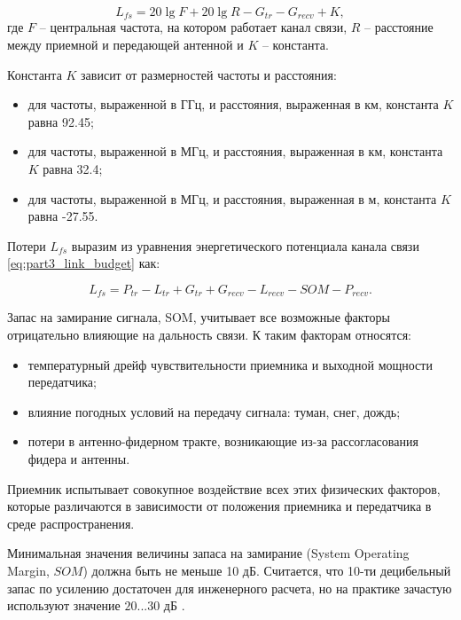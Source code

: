 \begin{equation}
  \label{eq:part3_L_fs}
  L_{fs} = 20 \lg{F} + 20\lg{R} - G_{tr} - G_{recv} + K,
  \end{equation}
где $F$ -- центральная частота, на котором работает канал связи, $R$ -- расстояние между приемной и передающей антенной и $K$ -- константа.

Константа $K$ зависит от размерностей частоты и расстояния:

\begin{itemize}
  \item для частоты, выраженной в ГГц, и расстояния, выраженная в км, константа $K$ равна 92.45;
  \item для частоты, выраженной в МГц, и расстояния, выраженная в км, константа $K$ равна 32.4;
  \item для частоты, выраженной в МГц, и расстояния, выраженная в м, константа $K$ равна -27.55.
\end{itemize} 

Потери $L_{fs}$ выразим из уравнения энергетического потенциала канала связи \cref{eq:part3_link_budget} как:

\begin{equation}
  \label{eq:part3_L_fs_from_link_budget}
  L_{fs} = P_{tr} - L_{tr} + G_{tr} + G_{recv} - L_{recv} - SOM - P_{recv}.
\end{equation}


Запас на замирание сигнала, SOM,  учитывает все возможные факторы отрицательно влияющие на дальность связи. К таким факторам относятся:

\begin{itemize}
  \item температурный дрейф чувствительности приемника и выходной мощности передатчика;
  \item влияние погодных условий на передачу сигнала: туман, снег, дождь;
  \item  потери в антенно-фидерном тракте, возникающие из-за рассогласования фидера и антенны.
\end{itemize}
Приемник испытывает совокупное воздействие всех этих физических факторов, которые различаются в зависимости от положения приемника и передатчика в среде распространения. 

Минимальная значения величины запаса на замирание  (System Operating Margin, $SOM$) должна быть не меньше  10 дБ. Считается, что 10-ти децибельный запас по усилению достаточен для инженерного расчета, но на практике зачастую используют значение $20 ... 30$ дБ \cite{Proletarsky}.

